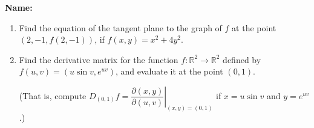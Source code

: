 \documentclass[12pt]{article}
\newcommand{\R}{\mathbb{R}}
\begin{document}
{\bf \Large Name:}
\thispagestyle{fancy}

 \begin{enumerate}
 \item Find the equation of the tangent plane to the graph of $f$ at the point $(2,-1,f(2,-1))$, if $f(x,y) = x^2+4y^2$.

\vspace{3.75in}

 \item Find the derivative matrix for the function $f:\R^2\to \R^2$ defined by $f(u,v) = (u\sin v, e^{uv})$, and evaluate it at the point $(0,1)$.

(That is, compute $D_{(0,1)}f = \left.\dfrac{\partial(x,y)}{\partial (u,v)}\right|_{(x,y)=(0,1)}$ if $x=u\sin v$ and $y=e^{uv}$.)
 \end{enumerate}
\end{document}
